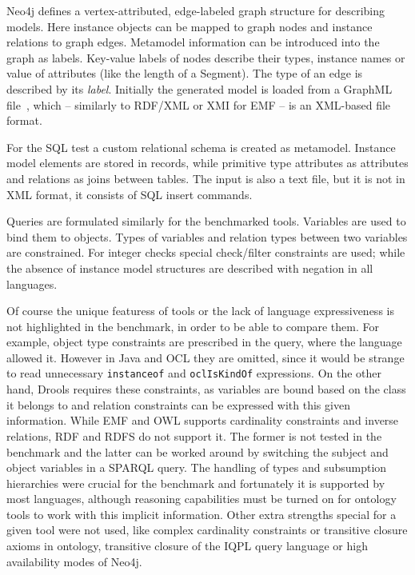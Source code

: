 Neo4j defines a vertex-attributed, edge-labeled graph structure for describing
models. Here instance objects can be mapped to graph nodes and instance
relations to graph edges. Metamodel information can be introduced into the graph
as labels. Key-value labels of nodes describe their types, instance names or
value of attributes (like the length of a Segment). The type of an edge is described by its \emph{label}.
Initially the generated model is loaded from a GraphML file~\cite{GraphML},
which -- similarly to RDF/XML or XMI for EMF -- is an XML-based file format.

For the SQL test a custom relational schema is created as metamodel. Instance
model elements are stored in records, while primitive type attributes as
attributes and relations as joins between tables. The input is also a text
file, but it is not in XML format, it consists of SQL insert commands.

Queries are formulated similarly for the benchmarked tools. Variables are used
to bind them to objects. Types of variables and relation types between two
variables are constrained. For integer checks special check/filter constraints
are used; while the absence of instance model structures are described with
negation in all languages.


Of course the unique featuress of tools or the lack of language expressiveness is not
highlighted in the benchmark, in order to be able to compare them. For example,
object type constraints are prescribed in the query, where the language allowed it.
However in Java and OCL they are omitted, since it would be strange to read
unnecessary \texttt{instanceof} and \texttt{oclIsKindOf} expressions. On the other
hand, Drools requires these constraints, as variables are bound based on the
class it belongs to and relation constraints can be expressed with this given
information. While EMF and OWL supports cardinality constraints and inverse
relations, RDF and RDFS do not support it. The former is not tested in the
benchmark and the latter can be worked around by switching the subject and
object variables in a SPARQL query.
The handling of types and subsumption hierarchies were crucial for the
benchmark and fortunately it is supported by most languages, although
reasoning capabilities must be turned on for ontology tools to work with this
implicit information. Other extra strengths special for a given tool were not
used, like complex cardinality constraints or transitive closure axioms in
ontology, transitive closure of the IQPL query language or high availability
modes of Neo4j.

